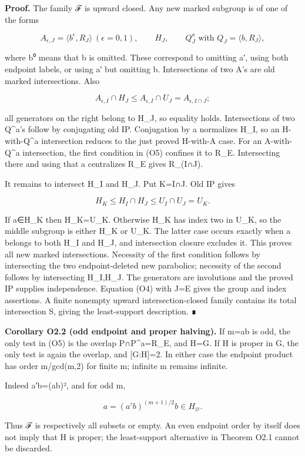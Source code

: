 \documentclass[
  10pt,
  letterpaper,
]{article}
\newcounter{none} %
\begin{document}
\textbf{Proof.} The family ℱ is upward closed. Any new marked subgroup
is of one of the forms

\[
A_{\epsilon,J}=\langle b^\epsilon,R_J\rangle\ (\epsilon=0,1),
\qquad H_J,\qquad Q_J^a\text{ with }Q_J=\langle b,R_J\rangle,
\tag{O6}
\]

where b⁰ means that b is omitted. These correspond to omitting a′, using
both endpoint labels, or using a′ but omitting b. Intersections of two
A's are old marked intersections. Also

\[
A_{\epsilon,I}\cap H_J
\le A_{\epsilon,I}\cap U_J=A_{\epsilon,I\cap J};
\]

all generators on the right belong to H\_J, so equality holds.
Intersections of two Q\^{}a's follow by conjugating old IP. Conjugation
by a normalizes H\_I, so an H-with-Q\^{}a intersection reduces to the
just proved H-with-A case. For an A-with-Q\^{}a intersection, the first
condition in (O5) confines it to R\_E. Intersecting there and using that
a centralizes R\_E gives R\_(I∩J).

It remains to intersect H\_I and H\_J. Put K=I∩J. Old IP gives

\[
H_K\le H_I\cap H_J\le U_I\cap U_J=U_K.
\tag{O7}
\]

If a∈H\_K then H\_K=U\_K. Otherwise H\_K has index two in U\_K, so the
middle subgroup is either H\_K or U\_K. The latter case occurs exactly
when a belongs to both H\_I and H\_J, and intersection closure excludes
it. This proves all new marked intersections. Necessity of the first
condition follows by intersecting the two endpoint-deleted new
parabolics; necessity of the second follows by intersecting H\_I,H\_J.
The generators are involutions and the proved IP supplies independence.
Equation (O4) with J=E gives the group and index assertions. A finite
nonempty upward intersection-closed family contains its total
intersection S, giving the least-support description. ∎

\textbf{Corollary O2.2 (odd endpoint and proper halving).} If
m=\textbar ab\textbar{} is odd, the only test in (O5) is the overlap
P∩P\^{}a=R\_E, and H=G. If H is proper in G, the only test is again the
overlap, and {[}G:H{]}=2. In either case the endpoint product has order
m/gcd(m,2) for finite m; infinite m remains infinite.

Indeed a′b=(ab)², and for odd m,

\[
a=(a'b)^{(m+1)/2}b\in H_\varnothing.
\]

Thus ℱ is respectively all subsets or empty. An even endpoint order by
itself does not imply that H is proper; the least-support alternative in
Theorem O2.1 cannot be discarded.
\end{document}
